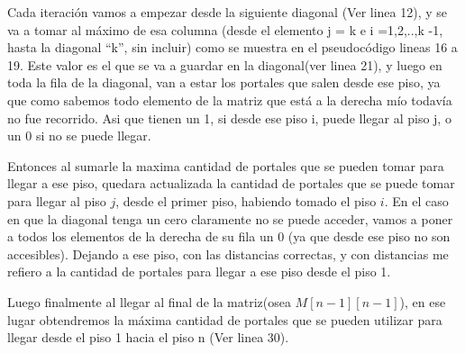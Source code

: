 Cada iteración vamos a empezar desde la siguiente diagonal (Ver linea 12), y se va a tomar al máximo de esa columna (desde el elemento j = k e i =1,2,..,k -1, hasta la diagonal “k”, sin incluir) como se muestra en el pseudocódigo lineas 16 a 19. Este valor es el que se va a guardar en la diagonal(ver linea 21), y luego en toda la fila de la diagonal, van a estar los portales que salen desde ese piso, ya que como sabemos todo elemento de la matriz que está a la derecha mío todavía no fue recorrido. Asi que tienen un 1, si desde ese piso i, puede llegar al piso j, o un 0 si no se puede llegar.

Entonces al sumarle la maxima cantidad de portales que se pueden tomar para llegar a ese piso, quedara actualizada la cantidad de portales que se puede tomar para llegar al piso $j$, desde el primer piso, habiendo tomado el piso $i$. En el caso en que la diagonal tenga un cero claramente no se puede acceder, vamos a poner a todos los elementos de la derecha de su fila un 0 (ya que desde ese piso no son accesibles).
Dejando a ese piso, con las distancias correctas, y con distancias me refiero a la cantidad de portales para llegar a ese piso desde el piso 1. \newline

Luego finalmente al llegar al final de la matriz(osea $ M[n-1][n-1] $), en ese lugar obtendremos la máxima cantidad de portales que se pueden utilizar para llegar desde el piso 1 hacia el piso n (Ver linea 30). \newline



